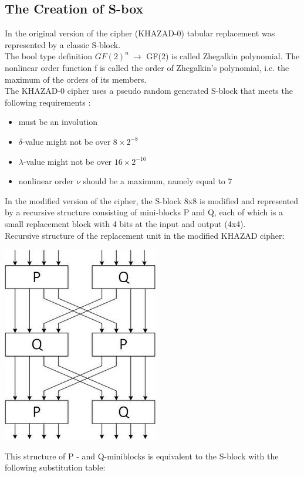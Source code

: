 \documentclass[preprint]{transcrypto}
\begin{document}
\subsection{The Creation of S-box} 
In the original version of the cipher (KHAZAD-0) tabular replacement was represented by a classic S-block.\\
The bool type definition $GF(2)^{n}\ \longrightarrow$  GF(2) is called Zhegalkin polynomial. The nonlinear order function f is called the order of Zhegalkin's polynomial, i.e. the maximum of the orders of its members.\\
The KHAZAD-0 cipher uses a pseudo random generated S-block that meets the following requirements :
\begin{itemize}
    \item must be an involution
    \item $\delta$-value might not be over $8 \times 2^{-8}$
    \item $\lambda$-value might not be over $16 \times 2^{-16}$
    \item nonlinear order $\nu$ should be a maximum, namely equal to 7
\end{itemize}
In the modified version of the cipher, the S-block 8x8 is modified and represented by a recursive structure consisting of mini-blocks P and Q, each of which is a small replacement block with 4 bits at the input and output (4x4). \\
Recursive structure of the replacement unit in the modified KHAZAD cipher:\cite{2} \\
\begin{center}
    \includegraphics[scale=0.6]{Screenshots/RecStructure.jpg}
\end{center} 
This structure of P - and Q-miniblocks is equivalent to the S-block with the following substitution table:
\end{document}
